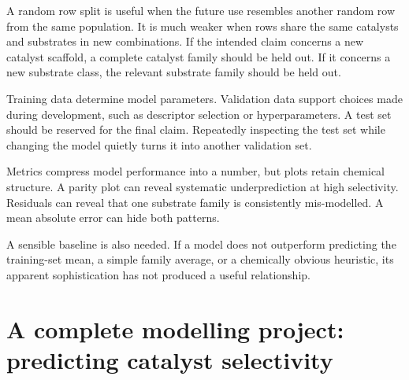 A random row split is useful when the future use resembles another random row from the same population.
It is much weaker when rows share the same catalysts and substrates in new combinations.
If the intended claim concerns a new catalyst scaffold, a complete catalyst family should be held out.
If it concerns a new substrate class, the relevant substrate family should be held out.


Training data determine model parameters.
Validation data support choices made during development, such as descriptor selection or hyperparameters.
A test set should be reserved for the final claim.
Repeatedly inspecting the test set while changing the model quietly turns it into another validation set.

Metrics compress model performance into a number, but plots retain chemical structure.
A parity plot can reveal systematic underprediction at high selectivity.
Residuals can reveal that one substrate family is consistently mis-modelled.
A mean absolute error can hide both patterns.


A sensible baseline is also needed.
If a model does not outperform predicting the training-set mean, a simple family average, or a chemically obvious heuristic, its apparent sophistication has not produced a useful relationship.

\section{A complete modelling project: predicting catalyst selectivity}

